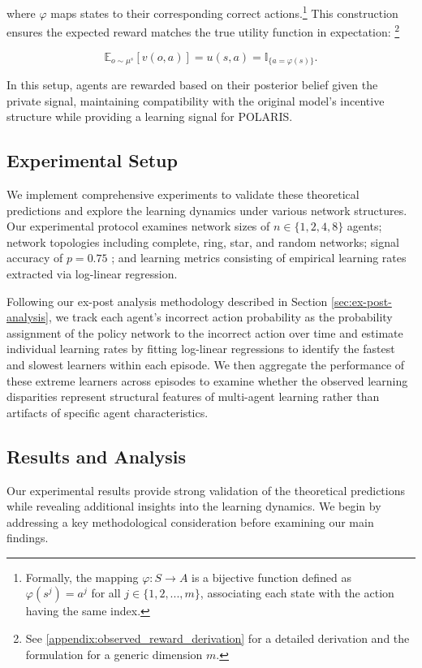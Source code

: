 where $\varphi$ maps states to their corresponding correct actions.\footnote{Formally, the mapping $\varphi: S \rightarrow A$ is a bijective function defined as $\varphi(s^j) = a^j$ for all $j \in \{1,2,...,m\}$, associating each state with the action having the same index.} This construction ensures the expected reward matches the true utility function in expectation: \footnote{See \ref{appendix:observed_reward_derivation} for a detailed derivation and the formulation for a generic dimension $m$.}

\begin{equation*}
    \mathbb{E}_{o \sim \mu^{s}}[v(o, a)] = u(s, a) = \mathbb{I}_{\{a = \varphi(s)\}}.
\end{equation*}


In this setup, agents are rewarded based on their posterior belief given the private signal, maintaining compatibility with the original model's incentive structure while providing a learning signal for POLARIS.

\subsection{Experimental Setup}

We implement comprehensive experiments to validate these theoretical predictions and explore the learning dynamics under various network structures. Our experimental protocol examines network sizes of $n \in \{1, 2, 4, 8\}$ agents; network topologies including complete, ring, star, and random networks; signal accuracy of $p = 0.75$ \iffalse(we use the same signal accuracy as in the paper's example where $r_{\text{aut}} \approx 0.14$, $r_{\text{crd}} \approx 0.55$, and $r_{\text{bdd}} \approx 1.10$)\fi; and learning metrics consisting of empirical learning rates extracted via log-linear regression.

Following our ex-post analysis methodology described in Section \ref{sec:ex-post-analysis}, we track each agent's incorrect action probability as the probability assignment of the policy network to the incorrect action over time and estimate individual learning rates by fitting log-linear regressions to identify the fastest and slowest learners within each episode. We then aggregate the performance of these extreme learners across episodes to examine whether the observed learning disparities represent structural features of multi-agent learning rather than artifacts of specific agent characteristics.

\subsection{Results and Analysis}
\iffalse
Our experimental results provide strong validation of the theoretical predictions while revealing additional insights into the learning dynamics. We begin by addressing a key methodological consideration before examining our main findings.

